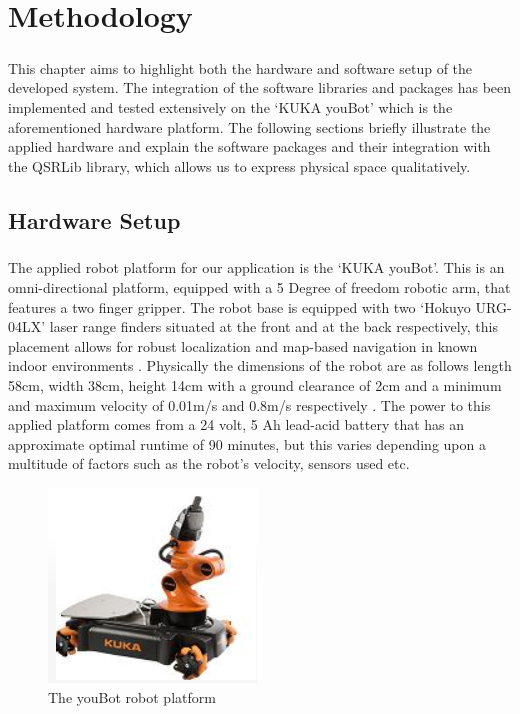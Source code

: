 \chapter{Methodology}
\paragraph{}This chapter aims to highlight both the hardware and software setup of the developed system. The integration of the software libraries and packages has been implemented and tested extensively on the `KUKA youBot' which is the aforementioned hardware platform. The following sections briefly illustrate the applied hardware and explain the software packages and their integration with the QSRLib library, which allows us to express physical space qualitatively. 

\section{Hardware Setup}
\paragraph{}The applied robot platform for our application is the `KUKA youBot'. This is an omni-directional platform, equipped with a 5 Degree of freedom robotic arm, that features a two finger gripper. The robot base is equipped with two `Hokuyo URG-04LX' laser range finders situated at the front and at the back respectively, this placement allows for robust localization and map-based navigation in known indoor environments \cite{Roscoe2012}. Physically the dimensions of the robot are as follows length 58cm, width 38cm, height 14cm with a ground clearance of 2cm and a minimum and maximum velocity of 0.01m/s and 0.8m/s respectively \cite{youbot}. The power to this applied platform comes from a 24 volt, 5 Ah lead-acid battery that has an approximate optimal runtime of 90 minutes, but this varies depending upon a multitude of factors such as the robot's velocity, sensors used etc.
\begin{figure}[h]
	\centering
	\includegraphics[scale=1]{images/youbot}
	\caption{The youBot robot platform}
	\label{fig:youbot}
\end{figure}

